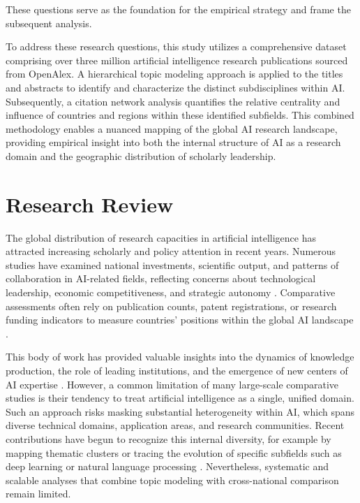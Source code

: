\documentclass{article}
\begin{document}
These questions serve as the foundation for the empirical strategy and frame the subsequent analysis.


To address these research questions, this study utilizes a comprehensive dataset comprising over three million artificial intelligence research publications sourced from OpenAlex. \cite{openalex2023} A hierarchical topic modeling approach is applied to the titles and abstracts to identify and characterize the distinct subdisciplines within AI. Subsequently, a citation network analysis quantifies the relative centrality and influence of countries and regions within these identified subfields. This combined methodology enables a nuanced mapping of the global AI research landscape, providing empirical insight into both the internal structure of AI as a research domain and the geographic distribution of scholarly leadership.

\section{Research Review}

The global distribution of research capacities in artificial intelligence has attracted increasing scholarly and policy attention in recent years. Numerous studies have examined national investments, scientific output, and patterns of collaboration in AI-related fields, reflecting concerns about technological leadership, economic competitiveness, and strategic autonomy \cite{REF}. Comparative assessments often rely on publication counts, patent registrations, or research funding indicators to measure countries’ positions within the global AI landscape \cite{REF}.

This body of work has provided valuable insights into the dynamics of knowledge production, the role of leading institutions, and the emergence of new centers of AI expertise \cite{REF}. However, a common limitation of many large-scale comparative studies is their tendency to treat artificial intelligence as a single, unified domain. Such an approach risks masking substantial heterogeneity within AI, which spans diverse technical domains, application areas, and research communities. Recent contributions have begun to recognize this internal diversity, for example by mapping thematic clusters or tracing the evolution of specific subfields such as deep learning or natural language processing \cite{REF}. Nevertheless, systematic and scalable analyses that combine topic modeling with cross-national comparison remain limited.
\end{document}
